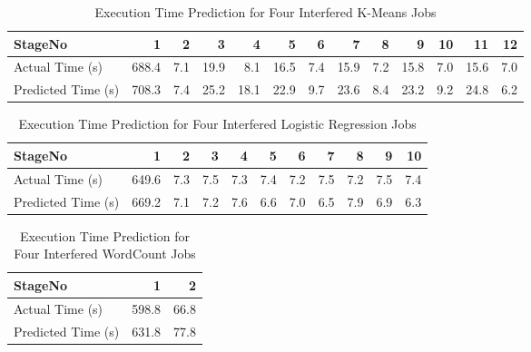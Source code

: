 \begin{table}[!htb]
\renewcommand{\arraystretch}{1.3}
\caption{Execution Time Prediction for Four Interfered K-Means Jobs}
\label{km20gkmIII}
\centering
\begin{tabular}{l|r|r|r|r|r|r|r|r|r|r|r|r}
\hline
\bfseries StageNo & \bfseries 1 & \bfseries 2 & \bfseries 3 & \bfseries 4 & \bfseries 5 & \bfseries 6 & \bfseries 7 & \bfseries 8 & \bfseries 9 & \bfseries 10 & \bfseries 11 & \bfseries 12\\
\hline \hline
Actual Time (s)
& 688.4
& 7.1
& 19.9
& 8.1
& 16.5
& 7.4
& 15.9
& 7.2
& 15.8
& 7.0
& 15.6
& 7.0 \\
\hline
Predicted Time (s) 
& 708.3
& 7.4
& 25.2
& 18.1
& 22.9
& 9.7
& 23.6
& 8.4
& 23.2
& 9.2
& 24.8
& 6.2 \\
\hline
\end{tabular}
\end{table}

\begin{table}[!htb]
\renewcommand{\arraystretch}{1.3}
\caption{Execution Time Prediction for Four Interfered Logistic Regression Jobs}
\label{lr20glrIII}
\centering
\begin{tabular}{l|r|r|r|r|r|r|r|r|r|r}
\hline
\bfseries StageNo & \bfseries 1 & \bfseries 2 & \bfseries 3 & \bfseries 4 & \bfseries 5 & \bfseries 6 & \bfseries 7 & \bfseries 8 & \bfseries 9 & \bfseries 10 \\
\hline \hline
Actual Time (s)
& 649.6
& 7.3
& 7.5
& 7.3
& 7.4
& 7.2
& 7.5
& 7.2
& 7.5
& 7.4\\
\hline
Predicted Time (s) 
& 669.2
& 7.1
& 7.2
& 7.6
& 6.6
& 7.0
& 6.5
& 7.9
& 6.9
& 6.3 \\
\hline
\end{tabular}
\end{table}


\begin{table}[!htb]
\renewcommand{\arraystretch}{1.3}
\caption{Execution Time Prediction for Four Interfered WordCount Jobs}
\label{wc20gwcIII}
\centering
\begin{tabular}{l|r|r}
\hline
\bfseries StageNo & \bfseries 1 & \bfseries 2 \\
\hline \hline
Actual Time (s)
& 598.8
& 66.8 \\
\hline
Predicted Time (s) 
& 631.8
& 77.8 \\
\hline
\end{tabular}
\end{table}


